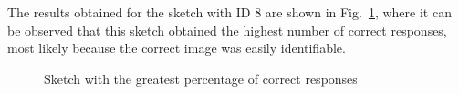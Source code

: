 %
\noindent The results obtained for the sketch with ID \num{8} are shown in Fig.~\ref{fig:result sketch with greatest numb of correct}, where it can be observed that this sketch obtained the highest number of correct responses, most likely because the correct image was easily identifiable.

\begin{figure}[!ht]
    \centering
     \quad
    \caption{Sketch with the greatest percentage of correct responses}
    \label{fig:result sketch with greatest numb of correct}
\end{figure}

